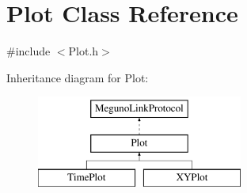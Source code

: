 \hypertarget{class_plot}{\section{Plot Class Reference}
\label{class_plot}
}


{\ttfamily \#include $<$Plot.\-h$>$}

Inheritance diagram for Plot\-:\begin{figure}[H]
\begin{center}
\leavevmode
\includegraphics[height=3.000000cm]{class_plot}
\end{center}
\end{figure}
